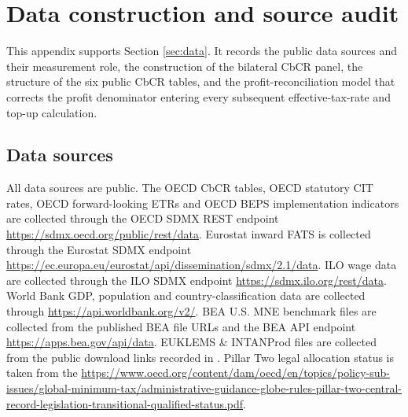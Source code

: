 \documentclass[11pt,a4paper]{article}
\begin{document}
\newpage
\printbibliography[heading=bibintoc]

\newpage
\appendix
\renewcommand{\thesection}{\Alph{section}}
\renewcommand{\theHsection}{appendix.\Alph{section}}
\renewcommand{\theHsubsection}{appendix.\Alph{section}.\arabic{subsection}}
\renewcommand{\theHsubsubsection}{appendix.\Alph{section}.\arabic{subsection}.\arabic{subsubsection}}
\renewcommand{\thetable}{\Alph{section}.\arabic{table}}
\renewcommand{\thefigure}{\Alph{section}.\arabic{figure}}
\renewcommand{\theequation}{\Alph{section}.\arabic{equation}}
\renewcommand{\theHtable}{appendix.\Alph{section}.\arabic{table}}
\renewcommand{\theHfigure}{appendix.\Alph{section}.\arabic{figure}}
\renewcommand{\theHequation}{appendix.\Alph{section}.\arabic{equation}}
\makeatletter
{}
\makeatother
\setcounter{table}{0}
\setcounter{figure}{0}
\setcounter{equation}{0}

\section{Data construction and source audit}\label{app:data}

This appendix supports Section \ref{sec:data}. It records the public data sources and their measurement role, the construction of the bilateral CbCR panel, the structure of the six public CbCR tables, and the profit-reconciliation model that corrects the profit denominator entering every subsequent effective-tax-rate and top-up calculation.

\subsection{Data sources}\label{app:source_provenance}

All data sources are public. The OECD CbCR tables, OECD statutory CIT rates, OECD forward-looking ETRs and OECD BEPS implementation indicators are collected through the OECD SDMX REST endpoint \url{https://sdmx.oecd.org/public/rest/data}. Eurostat inward FATS is collected through the Eurostat SDMX endpoint \url{https://ec.europa.eu/eurostat/api/dissemination/sdmx/2.1/data}. ILO wage data are collected through the ILO SDMX endpoint \url{https://sdmx.ilo.org/rest/data}. World Bank GDP, population and country-classification data are collected through \url{https://api.worldbank.org/v2/}. BEA U.S. MNE benchmark files are collected from the published BEA file URLs and the BEA API endpoint \url{https://apps.bea.gov/api/data}. EUKLEMS \& INTANProd files are collected from the public download links recorded in . Pillar Two legal allocation status is taken from the \url{https://www.oecd.org/content/dam/oecd/en/topics/policy-sub-issues/global-minimum-tax/administrative-guidance-globe-rules-pillar-two-central-record-legislation-transitional-qualified-status.pdf}.
\end{document}
